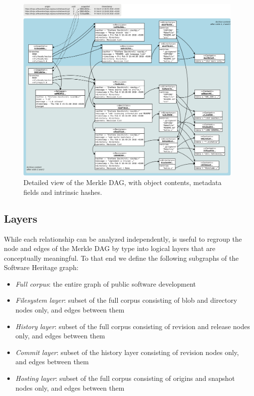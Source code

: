 \begin{figure}
    \centering
    \includegraphics[width=\textwidth]{img/swh-merkle-dag}
    \caption{Detailed view of the Merkle \gls{DAG}, with object contents,
    metadata fields and intrinsic hashes.}%
\end{figure}

\subsection{Layers}%
\label{sec:layers}

While each relationship can be analyzed independently, is useful to regroup
the node and edges of the Merkle \gls{DAG} by type into logical layers that are
conceptually meaningful.  To that end we define the following subgraphs of the
Software Heritage graph:
\begin{itemize}

\item \emph{Full corpus}: the entire graph of public software development

\item \emph{Filesystem layer}: subset of the full corpus consisting of blob and
  directory nodes only, and edges between them

\item \emph{History layer}: subset of the full corpus consisting of revision and
  release nodes only, and edges between them

\item \emph{Commit layer}: subset of the history layer consisting of revision
  nodes only, and edges between them

\item \emph{Hosting layer}: subset of the full corpus consisting of origins and
  snapshot nodes only, and edges between them

\end{itemize}


